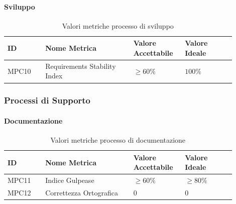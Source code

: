 \documentclass[a4paper,12pt]{article}
\begin{document}
                    \paragraph{Sviluppo} \mbox{}

                        \begin{longtable}{|M{0.15\linewidth}|M{0.35\linewidth}|M{0.2\linewidth}|M{0.2\linewidth}|}

                        \caption{Valori metriche processo di sviluppo} \\
                        \hline
                        \textbf{ID} & \textbf{Nome Metrica} & \textbf{Valore Accettabile} & \textbf{Valore Ideale} \\
                        \hline
                        \endhead

                        MPC10 & Requirements Stability Index & $\ge 60\%$ & $100\%$ \\
                        \hline

                    \end{longtable}


            \subsubsection{Processi di Supporto}
                \paragraph{Documentazione} \mbox{}
                    \begin{longtable}{|M{0.15\linewidth}|M{0.35\linewidth}|M{0.2\linewidth}|M{0.2\linewidth}|}

                        \caption{Valori metriche processo di documentazione} \\
                        \hline
                        \textbf{ID} & \textbf{Nome Metrica} & \textbf{Valore Accettabile} & \textbf{Valore Ideale} \\
                        \hline
                        \endhead

                        MPC11 & Indice Gulpease & $\ge 60\%$ & $\ge 80\%$ \\
                        \hline

                        MPC12 & Correttezza Ortografica & $0$ & $0$ \\
                        \hline

                    \end{longtable}
\end{document}
